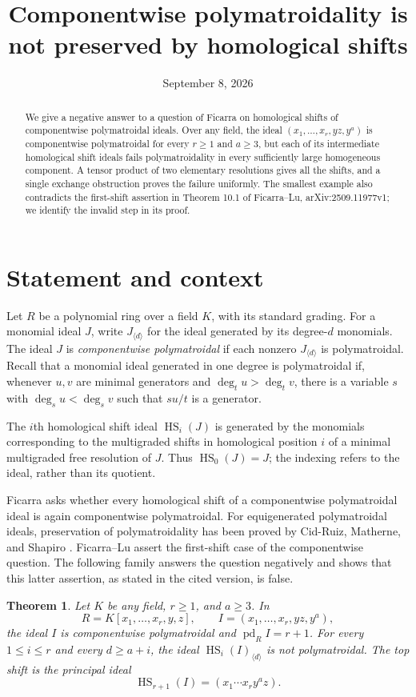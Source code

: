 \documentclass[11pt]{article}
\title{Componentwise polymatroidality is not preserved by homological shifts}
\author{}
\date{September 8, 2026}
\newtheorem{theorem}{Theorem}
\theoremstyle{remark}\newtheorem{remark}[theorem]{Remark}
\newcommand{\HS}{\operatorname{HS}}
\newcommand{\pd}{\operatorname{pd}}
\begin{document}
\maketitle
\begin{abstract}
We give a negative answer to a question of Ficarra on homological shifts of componentwise polymatroidal ideals. Over any field, the ideal $(x_1,\ldots,x_r,yz,y^a)$ is componentwise polymatroidal for every $r\geq1$ and $a\geq3$, but each of its intermediate homological shift ideals fails polymatroidality in every sufficiently large homogeneous component. A tensor product of two elementary resolutions gives all the shifts, and a single exchange obstruction proves the failure uniformly. The smallest example also contradicts the first-shift assertion in Theorem 10.1 of Ficarra--Lu, arXiv:2509.11977v1; we identify the invalid step in its proof.
\end{abstract}

\section{Statement and context}
Let $R$ be a polynomial ring over a field $K$, with its standard grading. For a monomial ideal $J$, write $J_{\langle d\rangle}$ for the ideal generated by its degree-$d$ monomials. The ideal $J$ is \emph{componentwise polymatroidal} if each nonzero $J_{\langle d\rangle}$ is polymatroidal. Recall that a monomial ideal generated in one degree is polymatroidal if, whenever $u,v$ are minimal generators and $\deg_tu>\deg_tv$, there is a variable $s$ with $\deg_su<\deg_sv$ such that $su/t$ is a generator.

The $i$th homological shift ideal $\HS_i(J)$ is generated by the monomials corresponding to the multigraded shifts in homological position $i$ of a minimal multigraded free resolution of $J$. Thus $\HS_0(J)=J$; the indexing refers to the ideal, rather than its quotient.

Ficarra \cite[Question 9]{F} asks whether every homological shift of a componentwise polymatroidal ideal is again componentwise polymatroidal. For equigenerated polymatroidal ideals, preservation of polymatroidality has been proved by Cid-Ruiz, Matherne, and Shapiro \cite[Theorem A]{CMS}. Ficarra--Lu \cite[Theorem 10.1]{FL} assert the first-shift case of the componentwise question. The following family answers the question negatively and shows that this latter assertion, as stated in the cited version, is false.

\begin{theorem}\label{main}
Let $K$ be any field, $r\geq1$, and $a\geq3$. In
\[
 R=K[x_1,\ldots,x_r,y,z],\qquad I=(x_1,\ldots,x_r,yz,y^a),
\]
the ideal $I$ is componentwise polymatroidal and $\pd_R I=r+1$. For every $1\leq i\leq r$ and every $d\geq a+i$, the ideal $\HS_i(I)_{\langle d\rangle}$ is not polymatroidal. The top shift is the principal ideal
\[
 \HS_{r+1}(I)=(x_1\cdots x_r y^a z).
\]
\end{theorem}
\end{document}

